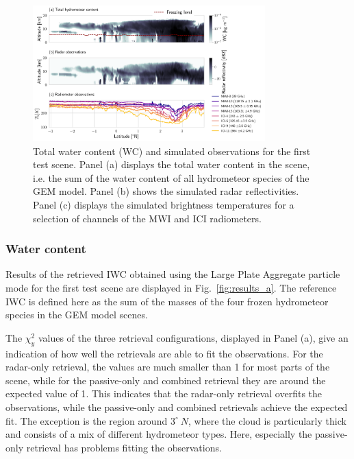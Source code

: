 \documentclass[journal abbreviation, manuscript]{copernicus}
\begin{document}
\begin{figure}
\centering \includegraphics[width = 0.8\textwidth]{../plots/observations_a}
\caption{Total water content (WC) and simulated observations for the first test
  scene. Panel (a) displays the total water content in the scene, i.e. the sum
  of the water content of all hydrometeor species of the GEM model. Panel (b)
  shows the simulated radar reflectivities. Panel (c) displays the simulated
  brightness temperatures for a selection of channels of the MWI and ICI
  radiometers.}
\label{fig:observations_a}
\end{figure}

\subsubsection{Water content}

Results of the retrieved IWC obtained using the Large Plate Aggregate particle
mode for the first test scene are displayed in Fig.~\ref{fig:results_a}. The
reference IWC is defined here as the sum of the masses of the four frozen
hydrometeor species in the GEM model scenes.

The $\chi^2_y$ values of the three retrieval configurations, displayed in Panel
(a), give an indication of how well the retrievals are able to fit the
observations. For the radar-only retrieval, the values are much smaller than 1
for most parts of the scene, while for the passive-only and combined retrieval
they are around the expected value of 1. This indicates that the radar-only
retrieval overfits the observations, while the passive-only and combined
retrievals achieve the expected fit. The exception is the region around
$3^\circ\ N$, where the cloud is particularly thick and consists of a mix of
different hydrometeor types. Here, especially the passive-only retrieval has
problems fitting the observations.
\end{document}
